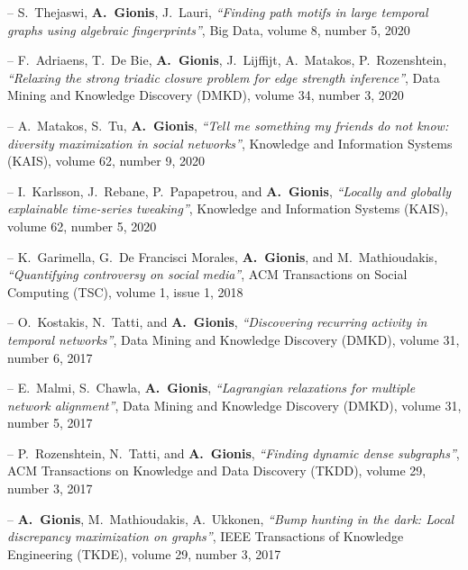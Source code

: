 \documentclass[a4paper,11pt]{article}
\begin{document}
\item[--] 
{S.\ Thejaswi, \textbf{A.\ Gionis}, J.\ Lauri},
{\em ``Finding path motifs in large temporal graphs using algebraic fingerprints''},
Big Data, volume 8, number 5, 2020

\item[--] 
{F.\ Adriaens, T.\ De Bie, \textbf{A.\ Gionis}, J.\ Lijffijt, A.\ Matakos, P.\ Rozenshtein},
{\em ``Relaxing the strong triadic closure problem for edge strength inference''},
Data Mining and Knowledge Discovery (DMKD),
volume 34, number 3, 2020

\item[--] 
{A.\ Matakos, S.\ Tu, \textbf{A.\ Gionis}},
{\em ``Tell me something my friends do not know: diversity maximization in social networks''}, 
Knowledge and Information Systems (KAIS),
volume 62, number 9, 2020

\item[--] 
{I.\ Karlsson, J.\ Rebane, P.\ Papapetrou, and \textbf{A.\ Gionis}}, 
{\em ``Locally and globally explainable time-series tweaking''}, 
Knowledge and Information Systems (KAIS),
volume 62, number 5, 2020

\item[--]
{K.\ Garimella, G.\ De Francisci Morales, \textbf{A.\ Gionis}, and M.\ Mathioudakis}, 
{\em ``Quantifying controversy on social media''},
ACM Transactions on Social Computing (TSC),
volume 1, issue 1, 2018

\item[--]
{O.\ Kostakis, N.\ Tatti, and \textbf{A.\ Gionis}}, 
{\em ``Discovering recurring activity in temporal networks''},
Data Mining and Knowledge Discovery (DMKD),
volume 31, number 6, 2017

\item[--]
{E.\ Malmi, S.\ Chawla, \textbf{A.\ Gionis}}, 
{\em ``Lagrangian relaxations for multiple network alignment''},
Data Mining and Knowledge Discovery (DMKD),
volume 31, number 5, 2017

\item[--]
{P.\ Rozenshtein, N.\ Tatti, and \textbf{A.\ Gionis}}, 
{\em ``Finding dynamic dense subgraphs''}, 
ACM Transactions on Knowledge and Data Discovery (TKDD), volume 29, number 3, 2017

\item[--]
{\textbf{A.\ Gionis}, M.\ Mathioudakis, A.\ Ukkonen}, 
{\em ``Bump hunting in the dark: Local discrepancy maximization on graphs''}, 
IEEE Transactions of Knowledge Engineering (TKDE), volume 29, number 3, 2017
\end{document}
